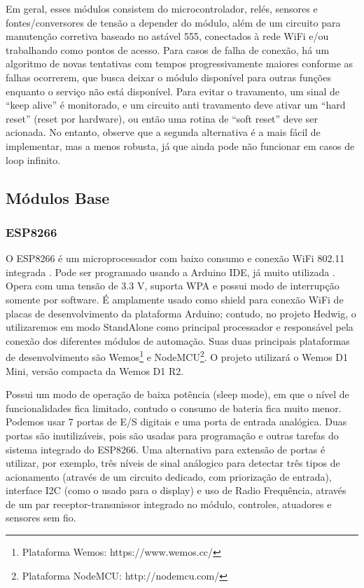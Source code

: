Em geral, esses módulos consistem do microcontrolador, relés, sensores e fontes/conversores de tensão a depender do módulo, além de um circuito para manutenção corretiva baseado no astável 555, conectados à rede WiFi e/ou trabalhando como pontos de acesso. Para casos de falha de conexão, há um algoritmo de novas tentativas com tempos progressivamente maiores conforme as falhas ocorrerem, que busca deixar o módulo disponível para outras funções enquanto o serviço não está disponível. Para evitar o travamento, um sinal de “keep alive” é monitorado, e um circuito anti travamento deve ativar um “hard reset” (reset por hardware), ou então uma rotina de “soft reset” deve ser acionada. No entanto, observe que a segunda alternativa é a mais fácil de implementar, mas a menos robusta, já que ainda pode não funcionar em casos de loop infinito.

\subsection{Módulos Base}
\subsubsection{ESP8266}
O ESP8266 é um microprocessador com baixo consumo e conexão WiFi 802.11 integrada \cite{espressif}. Pode ser programado usando a Arduino IDE, já muito utilizada \cite{thomsen}. Opera com uma tensão de 3.3 V, suporta WPA e possui modo de interrupção somente por software. É amplamente usado como shield para conexão WiFi de placas de desenvolvimento da plataforma Arduino; contudo, no projeto Hedwig, o utilizaremos em modo StandAlone como principal processador e responsável pela conexão dos diferentes módulos de automação. Suas duas principais plataformas de desenvolvimento são Wemos\footnote{Plataforma Wemos: https://www.wemos.cc/} e NodeMCU\footnote{Plataforma NodeMCU: http://nodemcu.com/}. O projeto utilizará o Wemos D1 Mini, versão compacta da Wemos D1 R2.

Possui um modo de operação de baixa potência (sleep mode), em que o nível de funcionalidades fica limitado, contudo o consumo de bateria fica muito menor. Podemos usar 7 portas de E/S digitais e uma porta de entrada analógica. Duas portas são inutilizáveis, pois são usadas para programação e outras tarefas do sistema integrado do ESP8266. Uma alternativa para extensão de portas é utilizar, por exemplo, três níveis de sinal análogico para detectar três tipos de acionamento (através de um circuito dedicado, com priorização de entrada), interface I2C (como o usado para o display) e uso de Radio Frequência, através de um par receptor-transmissor integrado no módulo, controles, atuadores e sensores sem fio.

